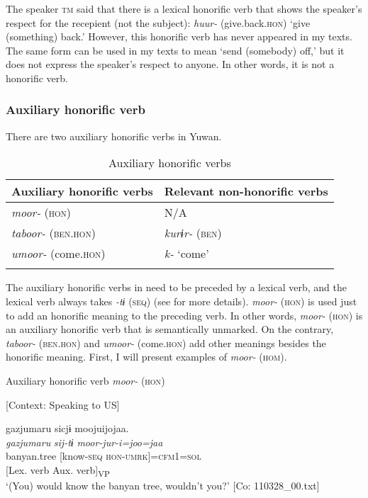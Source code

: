   The speaker \textsc{tm} said that there is a lexical honorific verb that shows the speaker’s respect for the recepient (not the subject): \textit{huur-} (give.back.\textsc{hon}) ‘give (something) back.’ However, this honorific verb has never appeared in my texts. The same form can be used in my texts to mean ‘send (somebody) off,’ but it does not express the speaker’s respect to anyone. In other words, it is not a honorific verb.

\subsubsection{Auxiliary honorific verb}

There are two auxiliary honorific verbs in Yuwan.

\begin{table}
\caption{\label{tab:key:73}Auxiliary honorific verbs}
\begin{tabular}{ll}
  \lsptoprule
Auxiliary honorific verbs  & Relevant non-honorific verbs\\
\midrule
\textit{moor-} (\textsc{hon}) &  N/A\\
\textit{taboor-} (\textsc{ben}.\textsc{hon}) &  \textit{kurɨr-} (\textsc{ben})\\
\textit{umoor-} (come.\textsc{hon}) &  \textit{k-} ‘come’\\
\lspbottomrule
\end{tabular}
\end{table}

The auxiliary honorific verbs in  need to be preceded by a lexical verb, and the lexical verb always takes \textit{-tɨ} (\textsc{seq}) (see  for more details). \textit{moor-} (\textsc{hon}) is used just to add an honorific meaning to the preceding verb. In other words, \textit{moor-} (\textsc{hon}) is an auxiliary honorific verb that is semantically unmarked. On the contrary, \textit{taboor-} (\textsc{ben}.\textsc{hon}) and \textit{umoor-} (come.\textsc{hon}) add other meanings besides the honorific meaning. First, I will present examples of \textit{moor-} (\textsc{hom}).

\ea\label{ex:8-25}
  Auxiliary honorific verb \textit{moor-} (\textsc{hon})

\ea{} [Context: Speaking to US]

{\TM}
\gllll  gazjumaru  sicjɨ  moojuijojaa.\\
\textit{gazjumaru}  \textit{sij-tɨ}  \textit{moor-jur-i=joo=jaa}\\
banyan.tree  [know-\textsc{seq}  \textsc{hon}-\textsc{umrk}]=\textsc{cfm1}=\textsc{sol}\\
        {}[Lex. verb  Aux. verb]\textsubscript{VP}\\
\glt ‘(You) would know the banyan tree, wouldn’t you?’ [Co: 110328\_00.txt]

